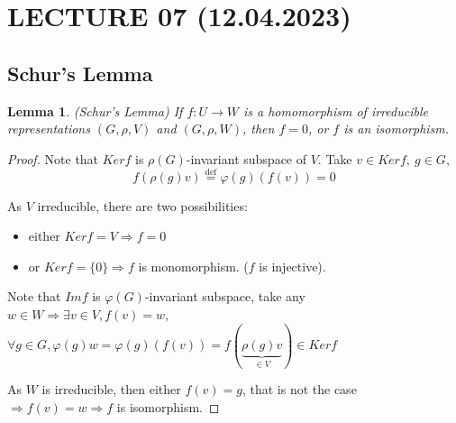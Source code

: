 \documentclass[12pt, a4paper]{article}
\newcounter{lemmacounter}
\newtheorem{lemma}[lemmacounter]{Lemma}
\theoremstyle{definition}
\newcommand*{\defeq}{\stackrel{\text{def}}{=}}
\begin{document}
\section{LECTURE 07 (12.04.2023)}
\subsection{Schur's Lemma}
\setcounter{lemmacounter}{0}
\begin{lemma}
    (Schur's Lemma) If $f: U \rightarrow W $ is a homomorphism of irreducible representations 
    $(G, \rho, V)$ and $(G, \rho, W)$, then $f=0 $, or $f$ is an isomorphism.
\end{lemma}
\begin{proof}
    Note that $Ker f$ is $\rho(G)$-invariant subspace of $V$. Take $v \in Kerf,\ g\in G$, 
    \[f(\rho(g)v) \defeq \varphi(g)(f(v))=0 \]
    \par
    As $V$ irreducible, there are two possibilities:
    \begin{itemize}[label={}]
        \item either $Kerf = V \Rightarrow f =0 $
        \item or $Kerf = \{0\} \Rightarrow f $ is monomorphism. ($f$ is injective).
    \end{itemize}
    \par
    Note that $Imf$ is $\varphi(G)$-invariant subspace, take any $w\in W \Rightarrow \exists 
    v \in V, f(v)=w $, $\forall g\in G, \varphi(g)w = \varphi(g)(f(v))  = f(\underbrace
    {\rho(g)v}_{\in V})\in Kerf$
    \par
    As $W$ is irreducible, then either $f(v) = g$, that is not the case $\Rightarrow f(v) = w
    \Rightarrow f $ is isomorphism.
\end{proof}
\end{document}
